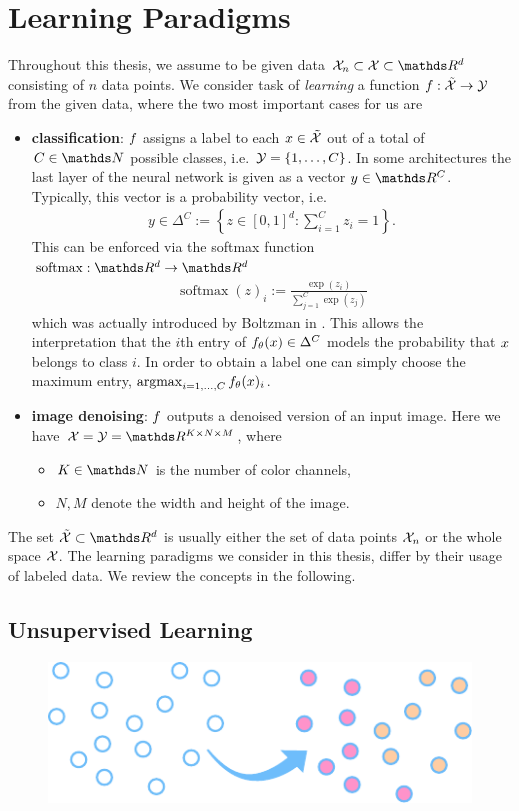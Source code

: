 \chapter{Learning Paradigms}\label{ch:para}

Throughout this thesis, we assume to be given data $\Inp_n\subset\Inp\subset \R^d$ consisting of $n$ data points. We consider task of \emph{learning} a function $f:\tilde{\mathcal{X}}\to \mathcal{\mathcal{Y}}$ from the given data, where the two most important cases for us are
%
\begin{itemize}
\item \textbf{classification}: $f$ assigns a label to each $x\in \tilde{\mathcal{X}}$ out of a total of $C\in\N$ possible classes, i.e. $\mathcal{\mathcal{Y}}=\{1,\ldots,C\}$. In some architectures the last layer of the neural network is given as a vector $\oup\in\R^C$. Typically, this vector is a probability vector, i.e. 
%
\begin{align*}
y\in \Delta^C := \left\{z\in[0,1]^d: \sum_{i=1}^C z_i = 1\right\}.
\end{align*}
%
This can be enforced via the softmax function \cite{bridle1990probabilistic} $\operatorname{soft max}:\R^d\to\R^d$
%
\begin{align*}
\operatorname{soft max}(z)_i := \frac{\exp(z_i)}{\sum_{j=1}^C \exp(z_j)} 	
\end{align*}
%
which was actually introduced by Boltzman in \cite{boltzmann1868studien}. This allows the interpretation that the $i$th entry of $f_\theta(x)\in\Delta^C$ models the probability that $x$ belongs to class $i$. In order to obtain a label one can simply choose the maximum entry, $\operatorname{argmax}_{i=1,\ldots,C} f_\theta(x)_i$.
%
\item \textbf{image denoising}: $f$ outputs a denoised version of an input image. Here we have $\Inp = \Oup=\R^{K\times N\times M}$, where
%
\begin{itemize}
\item $K\in\N$ is the number of color channels,
\item $N,M$ denote the width and height of the image.
\end{itemize}
\end{itemize}
%
The set $\tilde{\Inp}\subset\R^d$ is usually either the set of data points $\mathcal{X}_n$ or the whole space $\mathcal{X}$. The learning paradigms we consider in this thesis, differ by their usage of labeled data. We review the concepts in the following.
%
\clearpage%
\section{Unsupervised Learning}
\begin{figure}
\centering
\includegraphics[width=.5\textwidth]{atelier/paradigms/UL.pdf}
\end{figure}

